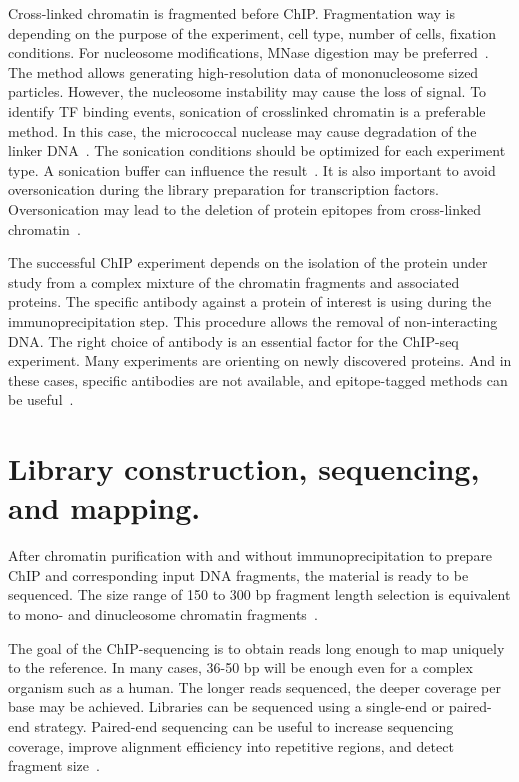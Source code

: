 Cross-linked chromatin is fragmented before ChIP. 
Fragmentation way is depending on the purpose of the experiment, cell type, number of cells, fixation conditions. 
For nucleosome modifications, MNase digestion may be preferred~\cite{kidder2011chip}.  
The method allows generating high-resolution data of mononucleosome sized particles. 
However, the nucleosome instability may cause the loss of signal.
To identify TF binding events, sonication of crosslinked chromatin is a preferable method. 
In this case, the micrococcal nuclease may cause degradation of the linker DNA~\cite{kidder2011chip}.
The sonication conditions should be optimized for each experiment type. 
A sonication buffer can influence the result~\cite{steger2008dot1l}. 
It is also important to avoid oversonication during the library preparation for transcription factors. 
Oversonication may lead to the deletion of protein epitopes from cross-linked chromatin~\cite{ostrow2015chip}. 


The successful ChIP experiment depends on the isolation of the protein under study from a complex mixture of the chromatin fragments and associated proteins. 
The specific antibody against a protein of interest is using during the immunoprecipitation step. 
This procedure allows the removal of non-interacting DNA. 
The right choice of antibody is an essential factor for the ChIP-seq experiment. 
Many experiments are orienting on newly discovered proteins. 
And in these cases, specific antibodies are not available, and epitope-tagged methods can be useful~\cite{brizzard2008epitope, goldberg2010distinct}.

\section{Library construction, sequencing, and mapping.}

After chromatin purification with and without immunoprecipitation to prepare ChIP and corresponding input DNA fragments, the material is ready to be sequenced. 
The size range of 150 to 300 bp fragment length selection is equivalent to mono- and dinucleosome chromatin fragments~\cite{kidder2011chip}.

The goal of the ChIP-sequencing is to obtain reads long enough to map uniquely to the reference.  
In many cases, 36-50 bp will be enough even for a complex organism such as a human. 
The longer reads sequenced, the deeper coverage per base may be achieved.
Libraries can be sequenced using a single-end or paired-end strategy. 
Paired-end sequencing can be useful to increase sequencing coverage, improve alignment efficiency into repetitive regions, and detect fragment size~\cite{kidder2011chip, chen2012systematic}.


